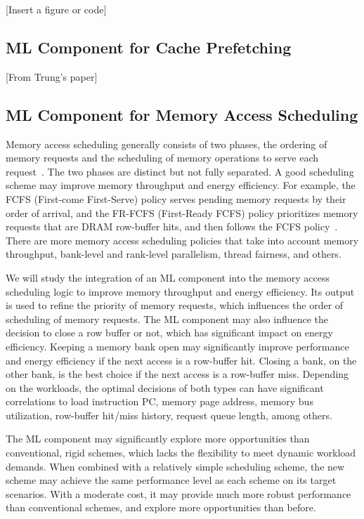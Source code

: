 [Insert a figure or code]

\subsection{ML Component for Cache Prefetching}

[From Trung's paper]

\subsection{ML Component for Memory Access Scheduling}

Memory access scheduling generally consists of two phases, the ordering of
memory requests and the scheduling of memory operations to serve each
request~\cite{}.  The two phases are distinct but not fully separated.  A good
scheduling scheme may improve memory throughput and energy efficiency.  For
example, the FCFS (First-come First-Serve) policy serves pending memory requests
by their order of arrival, and the FR-FCFS (First-Ready FCFS) policy prioritizes
memory requests that are DRAM row-buffer hits, and then follows the FCFS
policy~\cite{}.  There are more memory access scheduling policies that take into
account memory throughput, bank-level and rank-level parallelism, thread
fairness, and others.


We will study the integration of an ML component into the memory access
scheduling logic to improve memory throughput and energy efficiency.  Its output
is used to refine the priority of memory requests, which influences the order of
scheduling of memory requests.  The ML component may also influence the decision
to close a row buffer or not, which has significant impact on energy efficiency.
Keeping a memory bank open may significantly improve performance and energy
efficiency if the next access is a row-buffer hit.  Closing a bank, on the other
bank, is the best choice if the next access is a row-buffer miss.  Depending on
the workloads, the optimal decisions of both types can have significant
correlations to load instruction PC, memory page address, memory bus
utilization, row-buffer hit/miss history, request queue length, among others.

The ML component may significantly explore more opportunities than conventional,
rigid schemes, which lacks the flexibility to meet dynamic workload demands.
When combined with a relatively simple scheduling scheme, the new scheme may
achieve the same performance level as each scheme on its target scenarios.  With
a moderate cost, it may provide much more robust performance than conventional
schemes, and explore more opportunities than before.

